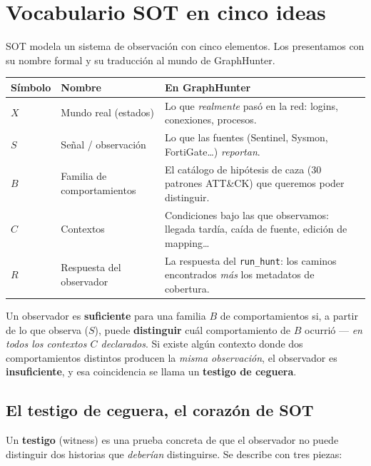 \documentclass[11pt,a4paper]{article}
\newcommand{\term}[1]{\textcolor{ghblue}{\textbf{#1}}}
\newcommand{\code}[1]{\texttt{\small #1}}
\begin{document}
\section{Vocabulario SOT en cinco ideas}

SOT modela un sistema de observación con cinco elementos. Los presentamos con
su nombre formal y su traducción al mundo de GraphHunter.

\begin{center}
\renewcommand{\arraystretch}{1.35}
\begin{tabular}{@{}p{1.4cm}p{3.6cm}p{9.4cm}@{}}
\toprule
\textbf{Símbolo} & \textbf{Nombre} & \textbf{En GraphHunter} \\
\midrule
$X$ & Mundo real (estados) & Lo que \emph{realmente} pasó en la red: logins, conexiones, procesos. \\
$S$ & Señal / observación & Lo que las fuentes (Sentinel, Sysmon, FortiGate\ldots) \emph{reportan}. \\
$B$ & Familia de comportamientos & El catálogo de hipótesis de caza (30 patrones ATT\&CK) que queremos poder distinguir. \\
$C$ & Contextos & Condiciones bajo las que observamos: llegada tardía, caída de fuente, edición de mapping\ldots \\
$R$ & Respuesta del observador & La respuesta del \code{run\_hunt}: los caminos encontrados \emph{más} los metadatos de cobertura. \\
\bottomrule
\end{tabular}
\end{center}

\begin{keybox}
Un observador es \term{suficiente} para una familia $B$ de comportamientos si,
a partir de lo que observa ($S$), puede \textbf{distinguir} cuál
comportamiento de $B$ ocurrió --- \emph{en todos los contextos $C$ declarados}.
Si existe algún contexto donde dos comportamientos distintos producen la
\emph{misma observación}, el observador es \textbf{insuficiente}, y esa
coincidencia se llama un \textbf{testigo de ceguera}.
\end{keybox}

\subsection{El testigo de ceguera, el corazón de SOT}

Un \term{testigo} (witness) es una prueba concreta de que el observador no
puede distinguir dos historias que \emph{deberían} distinguirse. Se describe
con tres piezas:
\end{document}
